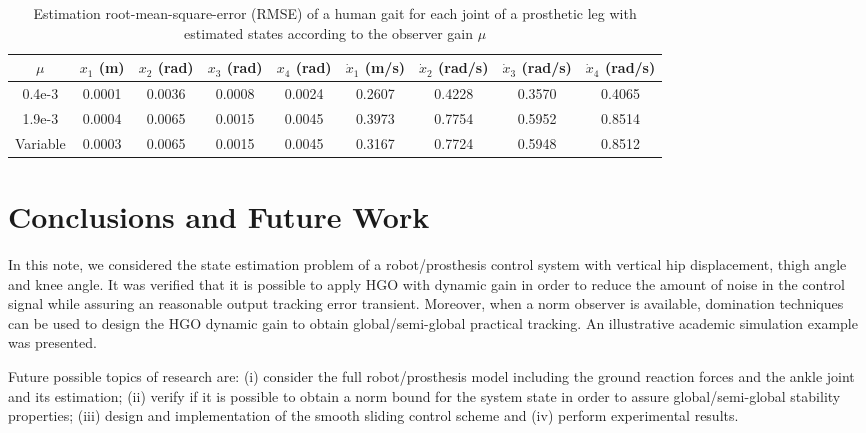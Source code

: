 \documentclass[letterpaper, 10 pt, journal, twocolumn]{IEEEtran}  %
\theoremstyle{plain}
\theoremstyle{definition}
\theoremstyle{remark}
\begin{document}
\begin{table}[]
	\centering
	\caption{Estimation root-mean-square-error (RMSE) of a human gait for each joint of a prosthetic leg with estimated states according to the observer gain $\mu$}
	\begin{tabular}{ccccccccc}
	\hline
	$\mu$      & $x_1$ (m) & $x_2$ (rad) & $x_3$ (rad) & $x_4$ (rad) & $\dot{x}_1$ (m/s) & $\dot{x}_2$ (rad/s) & $\dot{x}_3$ (rad/s) & $\dot{x}_4$ (rad/s) \\ \hline
	0.4e-3   & 0.0001 & 0.0036 & 0.0008  & 0.0024  & 0.2607  & 0.4228    &  0.3570   &  0.4065   \\
	1.9e-3   & 0.0004 & 0.0065 & 0.0015  & 0.0045  & 0.3973  & 0.7754    &  0.5952   &  0.8514   \\
	Variable & 0.0003 & 0.0065 & 0.0015  & 0.0045  & 0.3167  & 0.7724    &  0.5948   &  0.8512
	\end{tabular}
	\label{table:RMSE_est}
\end{table}

\section{Conclusions and Future Work}
\label{sec:Conclusions}

In this note, we considered the state estimation problem of a robot/prosthesis control system with vertical hip displacement, thigh angle and knee angle.  It was verified that it is possible to apply HGO with dynamic gain in order to reduce the amount of noise in the control signal while assuring an reasonable output tracking error transient. Moreover, when a norm observer is available, domination techniques can be used to design the HGO dynamic gain to obtain global/semi-global practical tracking. An illustrative academic simulation example was presented.


Future possible topics of research are: (i) consider the full robot/prosthesis model including the ground reaction forces and the ankle joint and its estimation; (ii) verify if it is possible to obtain a norm bound for the system state in order to assure global/semi-global stability properties; (iii) design and implementation of the smooth sliding control scheme and (iv) perform experimental results.
\end{document}
